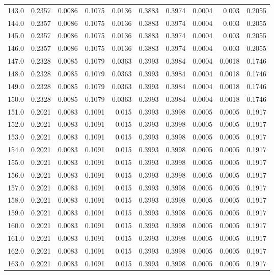 \begin{longtable}{lrrrrrrrrr}
143.0 & 0.2357 & 0.0086 & 0.1075 & 0.0136 & 0.3883 & 0.3974 & 0.0004 & 0.003 & 0.2055 \\
144.0 & 0.2357 & 0.0086 & 0.1075 & 0.0136 & 0.3883 & 0.3974 & 0.0004 & 0.003 & 0.2055 \\
145.0 & 0.2357 & 0.0086 & 0.1075 & 0.0136 & 0.3883 & 0.3974 & 0.0004 & 0.003 & 0.2055 \\
146.0 & 0.2357 & 0.0086 & 0.1075 & 0.0136 & 0.3883 & 0.3974 & 0.0004 & 0.003 & 0.2055 \\
147.0 & 0.2328 & 0.0085 & 0.1079 & 0.0363 & 0.3993 & 0.3984 & 0.0004 & 0.0018 & 0.1746 \\
148.0 & 0.2328 & 0.0085 & 0.1079 & 0.0363 & 0.3993 & 0.3984 & 0.0004 & 0.0018 & 0.1746 \\
149.0 & 0.2328 & 0.0085 & 0.1079 & 0.0363 & 0.3993 & 0.3984 & 0.0004 & 0.0018 & 0.1746 \\
150.0 & 0.2328 & 0.0085 & 0.1079 & 0.0363 & 0.3993 & 0.3984 & 0.0004 & 0.0018 & 0.1746 \\
151.0 & 0.2021 & 0.0083 & 0.1091 & 0.015 & 0.3993 & 0.3998 & 0.0005 & 0.0005 & 0.1917 \\
152.0 & 0.2021 & 0.0083 & 0.1091 & 0.015 & 0.3993 & 0.3998 & 0.0005 & 0.0005 & 0.1917 \\
153.0 & 0.2021 & 0.0083 & 0.1091 & 0.015 & 0.3993 & 0.3998 & 0.0005 & 0.0005 & 0.1917 \\
154.0 & 0.2021 & 0.0083 & 0.1091 & 0.015 & 0.3993 & 0.3998 & 0.0005 & 0.0005 & 0.1917 \\
155.0 & 0.2021 & 0.0083 & 0.1091 & 0.015 & 0.3993 & 0.3998 & 0.0005 & 0.0005 & 0.1917 \\
156.0 & 0.2021 & 0.0083 & 0.1091 & 0.015 & 0.3993 & 0.3998 & 0.0005 & 0.0005 & 0.1917 \\
157.0 & 0.2021 & 0.0083 & 0.1091 & 0.015 & 0.3993 & 0.3998 & 0.0005 & 0.0005 & 0.1917 \\
158.0 & 0.2021 & 0.0083 & 0.1091 & 0.015 & 0.3993 & 0.3998 & 0.0005 & 0.0005 & 0.1917 \\
159.0 & 0.2021 & 0.0083 & 0.1091 & 0.015 & 0.3993 & 0.3998 & 0.0005 & 0.0005 & 0.1917 \\
160.0 & 0.2021 & 0.0083 & 0.1091 & 0.015 & 0.3993 & 0.3998 & 0.0005 & 0.0005 & 0.1917 \\
161.0 & 0.2021 & 0.0083 & 0.1091 & 0.015 & 0.3993 & 0.3998 & 0.0005 & 0.0005 & 0.1917 \\
162.0 & 0.2021 & 0.0083 & 0.1091 & 0.015 & 0.3993 & 0.3998 & 0.0005 & 0.0005 & 0.1917 \\
163.0 & 0.2021 & 0.0083 & 0.1091 & 0.015 & 0.3993 & 0.3998 & 0.0005 & 0.0005 & 0.1917 \\

\end{longtable}

